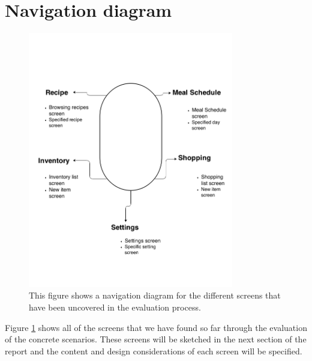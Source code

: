 \section{Navigation diagram}


\begin{figure}[H]
	\includegraphics[width=0.8\textwidth]{Grafik/FoodPlanner/NavigationsDiagram}
	\caption{This figure shows a navigation diagram for the different screens that have been uncovered in the evaluation process.}
	\label{NavigationDiagram}
\end{figure}

Figure \cref{NavigationDiagram} shows all of the screens that we have found so far through the evaluation of the concrete scenarios. These screens will be sketched in the next section of the report and the content and design considerations of each screen will be specified.  
